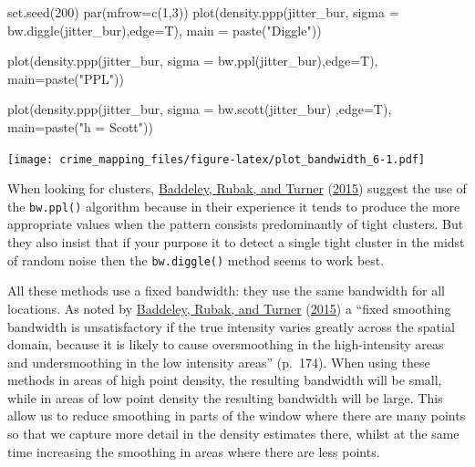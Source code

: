 \documentclass[
  krantz2]{krantz}
\makeatletter
\newenvironment{Shaded}{\begin{snugshade}}{\end{snugshade}}
\newcommand{\AttributeTok}[1]{\textcolor[rgb]{0.61,0.61,0.61}{#1}}
\newcommand{\DecValTok}[1]{\textcolor[rgb]{0.06,0.06,0.06}{#1}}
\newcommand{\FunctionTok}[1]{\textcolor[rgb]{0,0,0}{#1}}
\newcommand{\NormalTok}[1]{#1}
\newcommand{\StringTok}[1]{\textcolor[rgb]{0.5,0.5,0.5}{#1}}
\newenvironment{kframe}{%
\medskip{}
\setlength{\fboxsep}{.8em}
 \def\at@end@of@kframe{}%
 \ifinner\ifhmode%
  \def\at@end@of@kframe{\end{minipage}}%
  \begin{minipage}{\columnwidth}%
 \fi\fi%
 \def\FrameCommand##1{\hskip\@totalleftmargin \hskip-\fboxsep
 \colorbox{shadecolor}{##1}\hskip-\fboxsep
     \hskip-\linewidth \hskip-\@totalleftmargin \hskip\columnwidth}%
 \MakeFramed {\advance\hsize-\width
   \@totalleftmargin\z@ \linewidth\hsize
   \@setminipage}}%
 {\par\unskip\endMakeFramed%
 \at@end@of@kframe}
\renewenvironment{Shaded}{\begin{kframe}}{\end{kframe}}
\makeatother
\begin{document}
\begin{Shaded}
\begin{Highlighting}[]
\FunctionTok{set.seed}\NormalTok{(}\DecValTok{200}\NormalTok{)}
\FunctionTok{par}\NormalTok{(}\AttributeTok{mfrow=}\FunctionTok{c}\NormalTok{(}\DecValTok{1}\NormalTok{,}\DecValTok{3}\NormalTok{))}
\FunctionTok{plot}\NormalTok{(}\FunctionTok{density.ppp}\NormalTok{(jitter\_bur, }\AttributeTok{sigma =} \FunctionTok{bw.diggle}\NormalTok{(jitter\_bur),}\AttributeTok{edge=}\NormalTok{T),}
     \AttributeTok{main =} \FunctionTok{paste}\NormalTok{(}\StringTok{"Diggle"}\NormalTok{))}

\FunctionTok{plot}\NormalTok{(}\FunctionTok{density.ppp}\NormalTok{(jitter\_bur, }\AttributeTok{sigma =} \FunctionTok{bw.ppl}\NormalTok{(jitter\_bur),}\AttributeTok{edge=}\NormalTok{T),}
     \AttributeTok{main=}\FunctionTok{paste}\NormalTok{(}\StringTok{"PPL"}\NormalTok{))}

\FunctionTok{plot}\NormalTok{(}\FunctionTok{density.ppp}\NormalTok{(jitter\_bur, }\AttributeTok{sigma =} \FunctionTok{bw.scott}\NormalTok{(jitter\_bur) ,}\AttributeTok{edge=}\NormalTok{T),}
     \AttributeTok{main=}\FunctionTok{paste}\NormalTok{(}\StringTok{"h = Scott"}\NormalTok{))}
\end{Highlighting}
\end{Shaded}

\texttt{[image: crime\_mapping\_files/figure-latex/plot\_bandwidth\_6-1.pdf]}

When looking for clusters, \protect\hyperlink{ref-Baddeley_2016}{Baddeley, Rubak, and Turner} (\protect\hyperlink{ref-Baddeley_2016}{2015}) suggest the use of the \texttt{bw.ppl()} algorithm because in their experience it tends to produce the more appropriate values when the pattern consists predominantly of tight clusters. But they also insist that if your purpose it to detect a single tight cluster in the midst of random noise then the \texttt{bw.diggle()} method seems to work best.

All these methods use a fixed bandwidth: they use the same bandwidth for all locations. As noted by \protect\hyperlink{ref-Baddeley_2016}{Baddeley, Rubak, and Turner} (\protect\hyperlink{ref-Baddeley_2016}{2015}) a ``fixed smoothing bandwidth is unsatisfactory if the true intensity varies greatly across the spatial domain, because it is likely to cause oversmoothing in the high-intensity areas and undersmoothing in the low intensity areas'' (p.~174). When using these methods in areas of high point density, the resulting bandwidth will be small, while in areas of low point density the resulting bandwidth will be large. This allow us to reduce smoothing in parts of the window where there are many points so that we capture more detail in the density estimates there, whilst at the same time increasing the smoothing in areas where there are less points.
\end{document}
